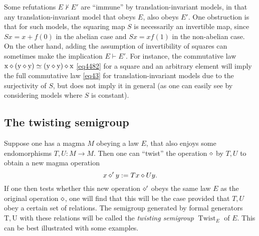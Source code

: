   Some refutations $E \not \vdash E'$ are ``immune'' by translation-invariant models, in that any translation-invariant model that obeys $E$, also obeys $E'$.  One obstruction is that for such models, the squaring map $S$ is necessarily an invertible map, since $Sx = x + f(0)$ in the abelian case and $Sx = xf(1)$ in the non-abelian case. On the other hand, adding the assumption of invertibility of squares can sometimes make the implication $E \vdash E'$.  For instance, the commutative law $\mathrm{x} \diamond (\mathrm{y} \diamond \mathrm{y}) \simeq (\mathrm{y} \diamond \mathrm{y}) \diamond \mathrm{x}$ \eqref{eq4482} for a square and an arbitrary element will imply the full commutative law \eqref{eq43} for translation-invariant models due to the surjectivity of $S$, but does not imply it in general (as one can easily see by considering models where $S$ is constant).

\subsection{The twisting semigroup}\label{twisting-sec}

Suppose one has a magma $M$ obeying a law $E$, that also enjoys some endomorphisms $T, U \colon M \to M$.  Then one can ``twist'' the operation $\diamond$ by $T,U$ to obtain a new magma operation
\begin{equation}\label{twist} x \diamond' y := Tx \diamond Uy.
\end{equation}
If one then tests whether this new operation $\diamond'$ obeys the same law $E$ as the original operation $\diamond$, one will find that this will be the case provided that $T,U$ obey a certain set of relations.  The semigroup generated by formal generators $\mathrm{T}, \mathrm{U}$ with these relations will be called the \emph{twisting semigroup} $\operatorname{Twist}_E$ of $E$.  This can be best illustrated with some examples.

